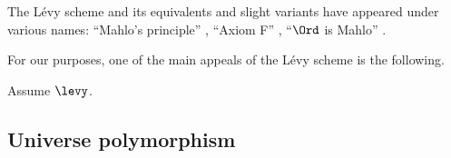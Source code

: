 \begin{nul}
	The Lévy scheme and its equivalents and slight variants
	have appeared under various names:
	\enquote{Mahlo's principle} \citep{Gloede1973},
	\enquote{Axiom F} \citep{Drake1974},
	\enquote{$ \Ord $ is Mahlo} \citep{Hamkins2003}.
\end{nul}

For our purposes,
one of the main appeals of the Lévy scheme
is the following.

\begin{theorem}
	Assume $ \levy $.
	
\end{theorem}

\subsection{Universe polymorphism}%
\label{sub:universe_polymorphism}





